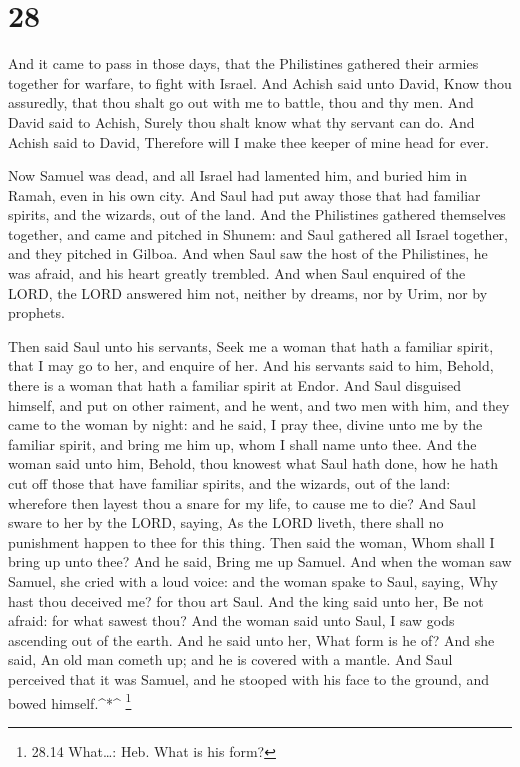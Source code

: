 \hypertarget{section-27}{%
\section{28}\label{section-27}}

 And it came to pass in those days, that the Philistines
gathered their armies together for warfare, to fight with Israel. And
Achish said unto David, Know thou assuredly, that thou shalt go out with
me to battle, thou and thy men.  And David said to Achish,
Surely thou shalt know what thy servant can do. And Achish said to
David, Therefore will I make thee keeper of mine head for ever.

 Now Samuel was dead, and all Israel had lamented him, and
buried him in Ramah, even in his own city. And Saul had put away those
that had familiar spirits, and the wizards, out of the land.
 And the Philistines gathered themselves together, and came
and pitched in Shunem: and Saul gathered all Israel together, and they
pitched in Gilboa.  And when Saul saw the host of the
Philistines, he was afraid, and his heart greatly trembled. 
And when Saul enquired of the LORD, the LORD answered him not, neither
by dreams, nor by Urim, nor by prophets.

 Then said Saul unto his servants, Seek me a woman that hath
a familiar spirit, that I may go to her, and enquire of her. And his
servants said to him, Behold, there is a woman that hath a familiar
spirit at Endor.  And Saul disguised himself, and put on
other raiment, and he went, and two men with him, and they came to the
woman by night: and he said, I pray thee, divine unto me by the familiar
spirit, and bring me him up, whom I shall name unto thee. 
And the woman said unto him, Behold, thou knowest what Saul hath done,
how he hath cut off those that have familiar spirits, and the wizards,
out of the land: wherefore then layest thou a snare for my life, to
cause me to die?  And Saul sware to her by the LORD,
saying, As the LORD liveth, there shall no punishment happen to thee for
this thing.  Then said the woman, Whom shall I bring up
unto thee? And he said, Bring me up Samuel.  And when the
woman saw Samuel, she cried with a loud voice: and the woman spake to
Saul, saying, Why hast thou deceived me? for thou art Saul.
 And the king said unto her, Be not afraid: for what sawest
thou? And the woman said unto Saul, I saw gods ascending out of the
earth.  And he said unto her, What form is he of? And she
said, An old man cometh up; and he is covered with a mantle. And Saul
perceived that it was Samuel, and he stooped with his face to the
ground, and bowed himself.\^{}*\^{} \footnote{28.14 What\ldots: Heb.
  What is his form?}

